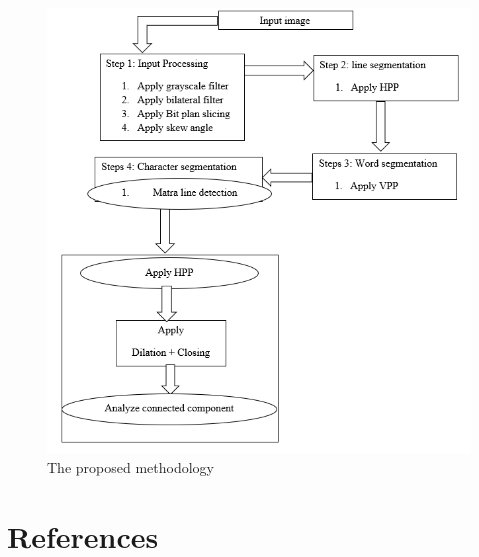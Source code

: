 \documentclass[a4paper,12pt]{article}
\begin{document}
\begin{figure}[h!]
\centering
\includegraphics[width=1.2\textwidth]{fig_1.png}
\caption{The proposed methodology}
\end{figure}

\section{References}
\end{document}
